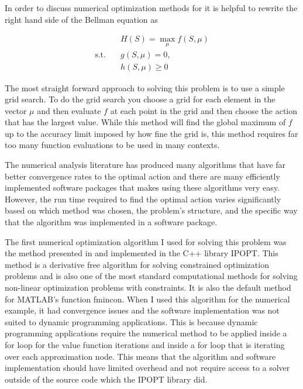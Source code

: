 \documentclass[12pt]{article}
\begin{document}
In order to discuss numerical optimization methods for it is helpful to rewrite the right hand side of the Bellman equation as

\begin{equation}
  \label{hdef}
  \begin{aligned}
    & H(S)=\max_{\mu} f(S,\mu) \\
    \text{s.t.}\quad & g(S, \mu)=0,\\
    & h(S,\mu) \geq 0
  \end{aligned}
\end{equation}

The most straight forward approach to solving this problem is to use a simple grid search. To do the grid search you choose a grid for each element in the vector $\mu$ and then evaluate $f$ at each point in the grid and then choose the action that has the largest value. While this method will find the global maximum of $f$ up to the accuracy limit imposed by how fine the grid is, this method requires far too many function evaluations to be used in many contexts.

The numerical analysis literature has produced many algorithms that have far better convergence rates to the optimal action and there are many efficiently implemented software packages that makes using these algorithms very easy. However, the run time required to find the optimal action varies significantly based on which method was chosen, the problem's structure, and the specific way that the algorithm was implemented in a software package.

The first numerical optimization algorithm I used for solving this problem was the method presented in \citet{ipopt} and implemented in the C++ library IPOPT. This method is a derivative free algorithm for solving constrained optimization problems and is also one of the most standard computational methods for solving non-linear optimization problems with constraints. It is also the default method for MATLAB's function fmincon. When I used this algorithm for the numerical example, it had convergence issues and the software implementation was not suited to dynamic programming applications. This is because dynamic programming applications require the numerical method to be applied inside a for loop for the value function iterations and inside a for loop that is iterating over each approximation node. This means that the algorithm and software implementation should have limited overhead and not require access to a solver outside of the source code which the IPOPT library did.
\end{document}
